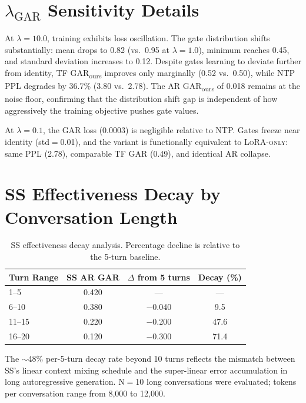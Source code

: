 \documentclass[11pt]{article}
\newcommand{\gar}{\textsc{GAR}}
\newcommand{\garours}{\textsc{GAR}\textsubscript{ours}}
\newcommand{\lo}{\textsc{LoRA-only}}
\begin{document}
\section{$\lambda_{\text{GAR}}$ Sensitivity Details}
\label{app:lambda}

At $\lambda=10.0$, training exhibits loss oscillation. The gate distribution shifts substantially: mean drops to 0.82 (vs.\ 0.95 at $\lambda=1.0$), minimum reaches 0.45, and standard deviation increases to 0.12. Despite gates learning to deviate further from identity, TF \garours{} improves only marginally (0.52 vs.\ 0.50), while NTP PPL degrades by 36.7\% (3.80 vs.\ 2.78). The AR \garours{} of 0.018 remains at the noise floor, confirming that the distribution shift gap is independent of how aggressively the training objective pushes gate values.

At $\lambda=0.1$, the \gar{} loss (0.0003) is negligible relative to NTP. Gates freeze near identity (std$=$0.01), and the variant is functionally equivalent to \lo{}: same PPL (2.78), comparable TF \gar{} (0.49), and identical AR collapse.

\section{SS Effectiveness Decay by Conversation Length}
\label{app:long_conv}

\begin{table}[h]
\centering
\small
\caption{SS effectiveness decay analysis. Percentage decline is relative to the 5-turn baseline.}
\label{tab:ss_decay}
\begin{tabular}{lccc}
\toprule
\textbf{Turn Range} & \textbf{SS AR \gar{}} & $\Delta$ \textbf{from 5 turns} & \textbf{Decay (\%)} \\
\midrule
1--5 & 0.420 & --- & --- \\
6--10 & 0.380 & $-$0.040 & 9.5 \\
11--15 & 0.220 & $-$0.200 & 47.6 \\
16--20 & 0.120 & $-$0.300 & 71.4 \\
\bottomrule
\end{tabular}
\end{table}

The $\sim$48\% per-5-turn decay rate beyond 10 turns reflects the mismatch between SS's linear context mixing schedule and the super-linear error accumulation in long autoregressive generation. N$=$10 long conversations were evaluated; tokens per conversation range from 8,000 to 12,000.
\end{document}
